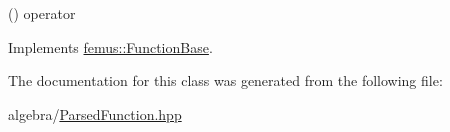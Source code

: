 () operator 

Implements \mbox{\hyperlink{classfemus_1_1_function_base_a2fdb73dd9cf7c4f4c4bdf28e4ee7f488}{femus\+::\+Function\+Base}}.



The documentation for this class was generated from the following file\+:\begin{DoxyCompactItemize}
\item 
algebra/\mbox{\hyperlink{_parsed_function_8hpp}{Parsed\+Function.\+hpp}}\end{DoxyCompactItemize}
